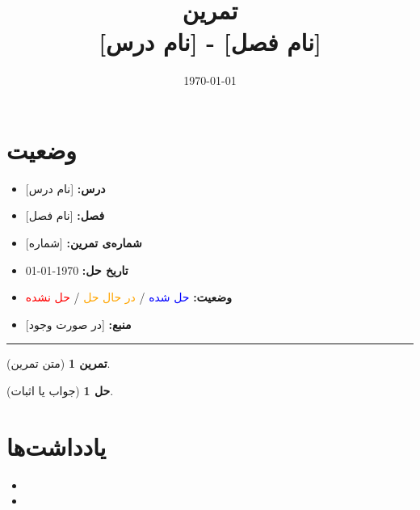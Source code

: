 \documentclass[a4paper,12pt]{article}
\title{%
	\Huge \textbf{تمرین} \\[0.3cm]
	\Large [نام درس] - [نام فصل]
}
\author{\lr{Ali Ashouri}}
\date{\today}
\theoremstyle{plain}
\newtheorem{exercise}{تمرین}
\newtheorem{solution}{حل}
\begin{document}
	
	\maketitle
	
	\section*{وضعیت}
	\begin{itemize}
		\item \textbf{درس:} [نام درس]
		\item \textbf{فصل:} [نام فصل]
		\item \textbf{شماره‌ی تمرین:} [شماره]
		\item \textbf{تاریخ حل:} \today
		\item \textbf{وضعیت:} \textcolor{blue}{حل شده} / \textcolor{orange}{در حال حل} / \textcolor{red}{حل نشده}
		\item \textbf{منبع:} [در صورت وجود]
	\end{itemize}
	\rule{\textwidth}{0.4pt}
	
	\begin{exercise}
		[متن تمرین]
	\end{exercise}
	
	\begin{solution}
		[جواب یا اثبات]
	\end{solution}
	
	\section*{یادداشت‌ها}
	\begin{itemize}
		\item [یادداشت اول]
		\item [یادداشت دوم]
	\end{itemize}
	
\end{document}
